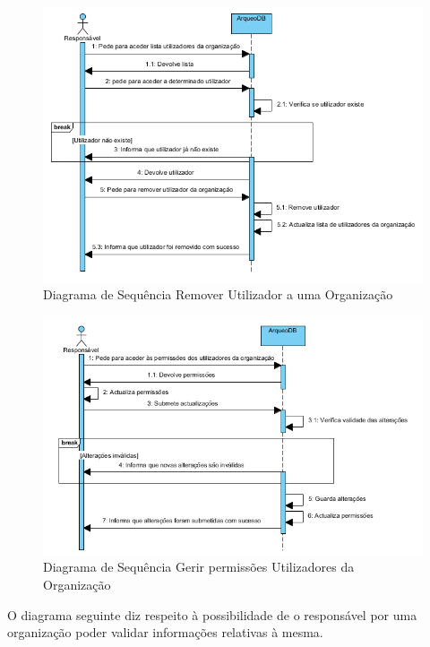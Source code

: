 ﻿\documentclass[12pt,a4paper]{article}
\begin{document}
\begin{figure}[h!]
\centering
\includegraphics[scale=1]{sequencia/removerutilizador}
\caption{Diagrama de Sequência Remover Utilizador a uma Organização} 
\end{figure}  

\begin{figure}[h!]
\centering
\includegraphics[scale=1]{sequencia/R_permissoes}
\caption{Diagrama de Sequência Gerir permissões Utilizadores da Organização} 
\end{figure}  

\clearpage
O diagrama seguinte diz respeito à possibilidade de o responsável por uma organização poder validar informações relativas à mesma.\\
\end{document}
